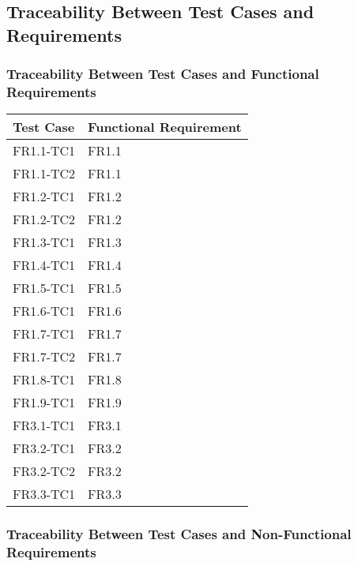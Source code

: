 \documentclass[12pt, titlepage]{article}
\begin{document}
\subsection{Traceability Between Test Cases and Requirements}


\subsubsection{Traceability Between Test Cases and Functional Requirements}

\begin{tabularx}{\textwidth}{p{5cm}p{5cm}}
\toprule {\bf Test Case} & {\bf Functional Requirement}\\
\midrule 
FR1.1-TC1 & FR1.1\\
FR1.1-TC2 & FR1.1\\
FR1.2-TC1 & FR1.2\\
FR1.2-TC2 & FR1.2\\
FR1.3-TC1 & FR1.3\\
FR1.4-TC1 & FR1.4\\
FR1.5-TC1 & FR1.5\\
FR1.6-TC1 & FR1.6\\
FR1.7-TC1 & FR1.7\\
FR1.7-TC2 & FR1.7\\
FR1.8-TC1 & FR1.8\\
FR1.9-TC1 & FR1.9\\
\midrule
FR3.1-TC1 & FR3.1\\
FR3.2-TC1 & FR3.2\\
FR3.2-TC2 & FR3.2\\
FR3.3-TC1 & FR3.3\\
\bottomrule
\end{tabularx}

\subsubsection{Traceability Between Test Cases and Non-Functional Requirements}
\end{document}
